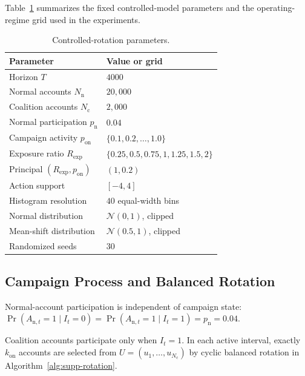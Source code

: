 Table~\ref{tab:supp-rotation-parameters} summarizes the fixed controlled-model
parameters and the operating-regime grid used in the experiments.
\begin{table}[t]
\caption{Controlled-rotation parameters.}
\label{tab:supp-rotation-parameters}
\centering
\small
\begin{tabular}{@{}ll@{}}
\toprule
\textbf{Parameter} & \textbf{Value or grid} \\
\midrule
Horizon $T$ & $4000$ \\
Normal accounts $N_{\mathrm n}$ & $20{,}000$ \\
Coalition accounts $N_{\mathrm c}$ & $2{,}000$ \\
Normal participation $p_{\mathrm n}$ & $0.04$ \\
Campaign activity $p_{\mathrm{on}}$
& $\{0.1,0.2,\ldots,1.0\}$ \\
Exposure ratio $R_{\mathrm{exp}}$
& $\{0.25,0.5,0.75,1,1.25,1.5,2\}$ \\
Principal $(R_{\mathrm{exp}},p_{\mathrm{on}})$
& $(1,0.2)$ \\
Action support & $[-4,4]$ \\
Histogram resolution & $40$ equal-width bins \\
Normal distribution & $\mathcal N(0,1)$, clipped \\
Mean-shift distribution & $\mathcal N(0.5,1)$, clipped \\
Randomized seeds & $30$ \\
\bottomrule
\end{tabular}
\end{table}

\subsection{Campaign Process and Balanced Rotation}
\label{sec:supp-rotation-process}

Normal-account participation is independent of campaign state:
$\Pr(A_{\mathrm n,t}=1\mid I_t=0)
=
\Pr(A_{\mathrm n,t}=1\mid I_t=1)
=
p_{\mathrm n}=0.04$.

Coalition accounts participate only when $I_t=1$. In each active interval,
exactly $k_{\mathrm{on}}$ accounts are selected from
$U=(u_1,\ldots,u_{N_{\mathrm c}})$ by cyclic balanced rotation in Algorithm~\ref{alg:supp-rotation}.

\begin{algorithm}[t]
\caption{Balanced coalition rotation}
\label{alg:supp-rotation}

\end{algorithm}

